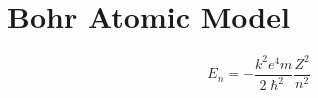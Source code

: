\section{Bohr Atomic Model}
\begin{equation}
  E_n=-\frac{k^2e^4m}{2\hslash^2}\frac{Z^2}{n^2}
\end{equation}
